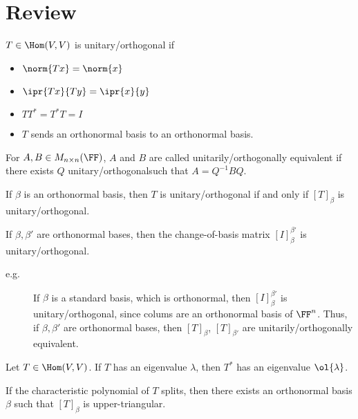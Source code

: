 \documentclass[11pt]{scrartcl}
\begin{document}
\section{Review}

$T \in \Hom(V,V)$ is unitary/orthogonal if
\begin{itemize}
\item $\norm{Tx}=\norm{x}$
\item $\ipr{Tx}{Ty} = \ipr{x}{y}$
\item $TT^{*} = T^{*}T = I$
\item $T$ sends an orthonormal basis to an orthonormal basis.
\end{itemize}

\begin{definition}
  For $A, B \in M_{n\times n}(\FF)$, $A$ and $B$ are called
  unitarily/orthogonally equivalent if there exists $Q$
  unitary/orthogonalsuch that $A=Q^{-1}BQ$.
\end{definition}
\begin{remark}
  If $\beta$ is an orthonormal basis, then $T$ is unitary/orthogonal
  if and only if $[T]_{\beta}$ is unitary/orthogonal.
\end{remark}
\begin{remark}
  If $\beta, \beta'$ are orthonormal bases, then the change-of-basis
  matrix $[I]_{\beta}^{\beta'}$ is unitary/orthogonal.
\end{remark}
\begin{description}

\item[e.g.] If $\beta$ is a standard basis, which is orthonormal, then
  $[I]_{\beta}^{\beta'}$ is unitary/orthogonal, since colums are an
  orthonormal basis of $\FF^n$. Thus, if $\beta, \beta'$ are
  orthonormal bases, then $[T]_{\beta}$, $[T]_{\beta'}$ are
  unitarily/orthogonally equivalent.
\end{description}

\begin{lemma}
  \label{sec:review}
  Let $T \in \Hom(V,V)$. If $T$ has an eigenvalue $\lambda$, then
  $T^{*}$ has an eigenvalue $\ol{\lambda}$.
\end{lemma}

\begin{theorem}
  If the characteristic polynomial of $T$ splits, then there exists an
  orthonormal basis $\beta$ such that $[T]_{\beta}$ is
  upper-triangular.
\end{theorem}
\end{document}
